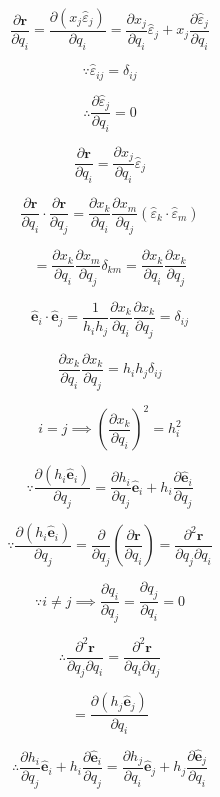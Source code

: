 \documentclass[12pt]{article}
\begin{document}
\[
    \frac{\partial \textbf{r}}{\partial q_i} = \frac{\partial (x_j \hat{\varepsilon}_j)}{\partial q_i}
    = \frac{\partial x_j}{\partial q_i} \hat{\varepsilon}_j + x_j \frac{\partial \hat{\varepsilon}_j}{\partial q_i}
\]

\[
    \because  \hat{\varepsilon}_{ij} = \delta_{ij}
\]

\[
    \therefore \frac{\partial \hat{\varepsilon}_j}{\partial q_i} = 0
\]

\[
    \frac{\partial \textbf{r}}{\partial q_i} = \frac{\partial x_j}{\partial q_i} \hat{\varepsilon}_j
\]

\[
    \frac{\partial \textbf{r}}{\partial q_i} \cdot \frac{\partial \textbf{r}}{\partial q_j}
    = \frac{\partial x_k}{\partial q_i} \frac{\partial x_m}{\partial q_j}
    \left(\hat{\varepsilon}_k \cdot \hat{\varepsilon}_m\right)
\]

\[
    = \frac{\partial x_k}{\partial q_i} \frac{\partial x_m}{\partial q_j} \delta_{km}
    = \frac{\partial x_k}{\partial q_i} \frac{\partial x_k}{\partial q_j}
\]

\[
    \hat{\textbf{e}}_i \cdot \hat{\textbf{e}}_j
    = \frac{1}{h_i h_j} \frac{\partial x_k}{\partial q_i} \frac{\partial x_k}{\partial q_j} = \delta_{ij}
\]

\[
    \frac{\partial x_k}{\partial q_i} \frac{\partial x_k}{\partial q_j} = h_i h_j \delta_{ij}
\]

\[
    i = j \implies {\left(\frac{\partial x_k}{\partial q_i}\right)}^2 = h_i^2
\]

\[
    \because \frac{\partial (h_i \hat{\textbf{e}}_i)}{\partial q_j}
    = \frac{\partial h_i}{\partial q_j} \hat{\textbf{e}}_i
    + h_i \frac{\partial \hat{\textbf{e}}_i}{\partial q_j}
\]

\[
    \because \frac{\partial (h_i \hat{\textbf{e}}_i)}{\partial q_j}
    = \frac{\partial}{\partial q_j} \left(\frac{\partial \textbf{r}}{\partial q_i}\right)
    = \frac{\partial^2 \textbf{r}}{\partial q_j \partial q_i}
\]

\[
    \because i \neq j \implies \frac{\partial q_i}{\partial q_j} = \frac{\partial q_j}{\partial q_i} = 0
\]

\[
    \therefore \frac{\partial^2 \textbf{r}}{\partial q_j \partial q_i}
    = \frac{\partial^2 \textbf{r}}{\partial q_i \partial q_j}
\]

\[
    = \frac{\partial (h_j \hat{\textbf{e}}_j)}{\partial q_i}
\]

\[
    \therefore \frac{\partial h_i}{\partial q_j} \hat{\textbf{e}}_i
    + h_i \frac{\partial \hat{\textbf{e}}_i}{\partial q_j}
    = \frac{\partial h_j}{\partial q_i} \hat{\textbf{e}}_j
    + h_j \frac{\partial \hat{\textbf{e}}_j}{\partial q_i}
\]
\end{document}
